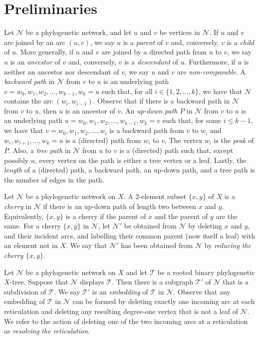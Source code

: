 \documentclass[11pt]{amsart}
\begin{document}
\section{Preliminaries}
\label{prelim}

Let ${{\mathcal N}}$ be a phylogenetic network, and let $u$ and $v$ be vertices in ${{\mathcal N}}$. If $u$ and $v$ are joined by an arc $(u, v)$, we say $u$ is a \emph{parent} of $v$ and, conversely, $v$ is a \emph{child} of $u$. More generally, if $u$ and $v$ are joined by a directed path from $u$ to $v$, we say $u$ is an \emph{ancestor} of $v$ and, conversely, $v$ is a \emph{descendant} of $u$. Furthermore, if $u$ is neither an ancestor nor descendant of $v$, we say $u$ and $v$ are \emph{non-comparable}. A \emph{backward path} in ${{\mathcal N}}$ from $v$ to $u$ is an underlying path $v=w_0, w_1, w_2, \ldots, w_{k-1}, w_k=u$ such that, for all $i\in \{1, 2, \ldots, k\}$, we have that ${{\mathcal N}}$ contains the arc $(w_i, w_{i-1})$. Observe that if there is a backward path in ${{\mathcal N}}$ from $v$ to $u$, then $u$ is an ancestor of $v$. An \emph{up-down path} $P$ in ${{\mathcal N}}$ from $v$ to $u$ is an underlying path $u=w_0, w_1, w_2, \ldots, w_{k-1}, w_k=v$ such that, for some $i\le k-1$, we have that $v=w_0, w_1, w_2, \ldots, w_i$ is a backward path from $v$ to $w_i$ and $w_i, w_{i+1}, \ldots, w_k=u$ is a (directed) path from $w_i$ to $v$. The vertex $w_i$ is the \emph{peak} of $P$. Also, a {\em tree path} in ${{\mathcal N}}$ from $u$ to $v$ is a (directed) path such that, except possibly $u$, every vertex on the path is either a tree vertex or a leaf. Lastly, the {\em length} of a (directed) path, a backward path, an up-down path, and a tree path is the number of edges in the path.

Let ${{\mathcal N}}$ be a phylogenetic network on $X$. A $2$-element subset $\{x, y\}$ of $X$ is a \emph{cherry} in ${{\mathcal N}}$ if there is an up-down path of length two between $x$ and $y$. Equivalently, $\{x, y\}$ is a cherry if the parent of $x$ and the parent of $y$ are the same. For a cherry $\{x, y\}$ in ${{\mathcal N}}$, let ${{\mathcal N}}'$ be obtained from ${{\mathcal N}}$ by deleting $x$ and $y$, and their incident arcs, and labelling their common parent (now itself a leaf) with an element not in $X$. We say that ${{\mathcal N}}'$ has been obtained from ${{\mathcal N}}$ by {\em reducing the cherry $\{x, y\}$}.

Let ${{\mathcal N}}$ be a phylogenetic network on $X$ and let ${{\mathcal T}}$ be a rooted binary phylogenetic $X$-tree. Suppose that ${{\mathcal N}}$ displays ${{\mathcal T}}$. Then there is a subgraph ${{\mathcal T}}'$ of ${{\mathcal N}}$ that is a subdivision of ${{\mathcal T}}$. We say ${{\mathcal T}}'$ is an {\em embedding} of ${{\mathcal T}}$ in ${{\mathcal N}}$. Observe that any embedding of ${{\mathcal T}}$ in ${{\mathcal N}}$ can be formed by deleting exactly one incoming arc at each reticulation and deleting any resulting degree-one vertex that is not a leaf of ${{\mathcal N}}$. We refer to the action of deleting one of the two incoming arcs at a reticulation as \emph{resolving the reticulation}.
\end{document}
